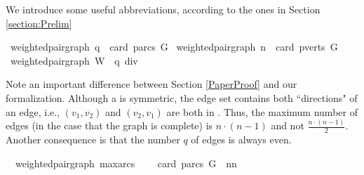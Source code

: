 \begin{isabellebody}
\begin{isamarkuptext}%
We introduce some useful abbreviations, according to the ones in Section \ref{section:Prelim}%
\end{isamarkuptext}\isamarkuptrue%
\isamarkupfalse%
{\isacharparenleft}\ weighted{\isacharunderscore}pair{\isacharunderscore}graph{\isacharparenright}\ {\isachardoublequoteopen}q\ {\isasymequiv}\ card\ {\isacharparenleft}parcs\ G{\isacharparenright}{\isachardoublequoteclose}\isanewline
{}\isamarkupfalse%
{\isacharparenleft}\ weighted{\isacharunderscore}pair{\isacharunderscore}graph{\isacharparenright}\ {\isachardoublequoteopen}n\ {\isasymequiv}\ card\ {\isacharparenleft}pverts\ G{\isacharparenright}{\isachardoublequoteclose}\isanewline
{}\isamarkupfalse%
{\isacharparenleft}\ weighted{\isacharunderscore}pair{\isacharunderscore}graph{\isacharparenright}\ {\isachardoublequoteopen}W\ {\isasymequiv}\ {\isacharbraceleft}{}{\isachardot}{\isachardot}q\ div\ {}{\isacharbraceright}{\isachardoublequoteclose}%
\begin{isamarkuptext}%
Note an important difference between Section \ref{PaperProof} and our formalization. Although 
a  is symmetric, the edge set contains both ``directions" of an edge, 
i.e., $(v_1,v_2)$ and $(v_2,v_1)$ are both in . Thus, the maximum number of edges (in the 
case that the graph is complete) is $n\cdot(n-1)$ and not $\frac{n\cdot(n-1)}{2}$. Another consequence is that
the number $q$ of edges is always even.%
\end{isamarkuptext}\isamarkuptrue%
\isamarkupfalse%
\ {\isacharparenleft}\ weighted{\isacharunderscore}pair{\isacharunderscore}graph{\isacharparenright}\ max{\isacharunderscore}arcs{\isacharcolon}\ \isanewline
\ \ \ {\isachardoublequoteopen}card\ {\isacharparenleft}parcs\ G{\isacharparenright}\ {\isasymle}\ n{\isacharasterisk}{\isacharparenleft}n{\isacharminus}{}{\isacharparenright}{\isachardoublequoteclose}%
\isadelimproof
%
\endisadelimproof
%
\isatagproof
%
\endisatagproof
{\isafoldproof}%
%
\isadelimproof
%
\endisadelimproof
%
\isadelimproof
%
\endisadelimproof
%
\isatagproof
%
\endisatagproof
{\isafoldproof}%
%
\isadelimproof
%
\endisadelimproof
%
\isadelimproof
%
\endisadelimproof
%
\isatagproof
%
\endisatagproof
{\isafoldproof}%
%
\isadelimproof
%
\endisadelimproof
%
\isadelimproof

\end{isabellebody}
